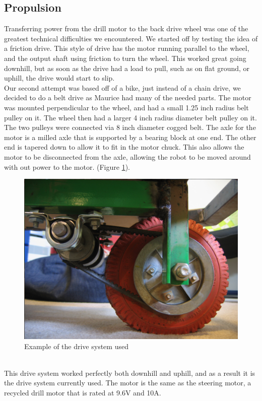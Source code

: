 \documentclass{article}
\begin{document}
\subsection{Propulsion}
Transferring power from the drill motor to the back drive wheel was one of the greatest technical difficulties we encountered. We started off by testing the idea of a friction drive. This style of drive has the motor running parallel to the wheel, and the output shaft using friction to turn the wheel. This worked great going downhill, but as soon as the drive had a load to pull, such as on flat ground, or uphill, the drive would start to slip.\\
Our second attempt was based off of a bike, just instead of a chain drive, we decided to do a belt drive as Maurice had many of the needed parts. The motor was mounted perpendicular to the wheel, and had a small 1.25 inch radius belt pulley on it. The wheel then had a larger 4 inch radius diameter belt pulley on it. The two pulleys were connected via 8 inch diameter cogged belt. The axle for the motor is a milled axle that is supported by a bearing block at one end. The other end is tapered down to allow it to fit in the motor chuck. This also allows the motor to be disconnected from the axle, allowing the robot to be moved around with out power to the motor. (Figure \ref{reardrive}).
\begin{figure}[htp]
  \begin{center}
\includegraphics[scale=0.25]{reardrive}
  \end{center}
  \caption{Example of the drive system used}
\label{reardrive}
\end{figure}\\
This drive system worked perfectly both downhill and uphill, and as a result it is the drive system currently used. The motor is the same as the steering motor, a recycled drill motor that is rated at 9.6V and 10A.\\
\end{document}
